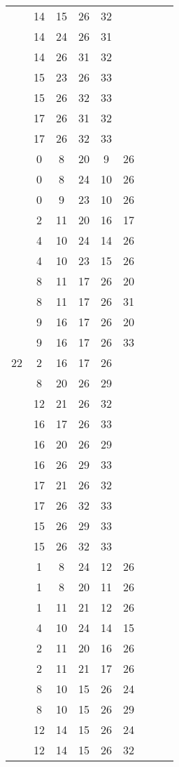 \begin{table}[H]
\begin{tabular}{|c|cccccccc|}
 & 14 & 15 & 26 & 32 &   &   &   &  \\
 & 14 & 24 & 26 & 31 &   &   &   &  \\
 & 14 & 26 & 31 & 32 &   &   &   &  \\
 & 15 & 23 & 26 & 33 &   &   &   &  \\
 & 15 & 26 & 32 & 33 &   &   &   &  \\
 & 17 & 26 & 31 & 32 &   &   &   &  \\
 & 17 & 26 & 32 & 33 &   &   &   &  \\
 & 0 & 8 & 20 & 9 & 26 &   &   &  \\
 & 0 & 8 & 24 & 10 & 26 &   &   &  \\
 & 0 & 9 & 23 & 10 & 26 &   &   &  \\
 & 2 & 11 & 20 & 16 & 17 &   &   &  \\
 & 4 & 10 & 24 & 14 & 26 &   &   &  \\
 & 4 & 10 & 23 & 15 & 26 &   &   &  \\
 & 8 & 11 & 17 & 26 & 20 &   &   &  \\
 & 8 & 11 & 17 & 26 & 31 &   &   &  \\
 & 9 & 16 & 17 & 26 & 20 &   &   &  \\
 & 9 & 16 & 17 & 26 & 33 &   &   &  \\
\hline
22  & 2 & 16 & 17 & 26 &   &   &   &  \\
 & 8 & 20 & 26 & 29 &   &   &   &  \\
 & 12 & 21 & 26 & 32 &   &   &   &  \\
 & 16 & 17 & 26 & 33 &   &   &   &  \\
 & 16 & 20 & 26 & 29 &   &   &   &  \\
 & 16 & 26 & 29 & 33 &   &   &   &  \\
 & 17 & 21 & 26 & 32 &   &   &   &  \\
 & 17 & 26 & 32 & 33 &   &   &   &  \\
 & 15 & 26 & 29 & 33 &   &   &   &  \\
 & 15 & 26 & 32 & 33 &   &   &   &  \\
 & 1 & 8 & 24 & 12 & 26 &   &   &  \\
 & 1 & 8 & 20 & 11 & 26 &   &   &  \\
 & 1 & 11 & 21 & 12 & 26 &   &   &  \\
 & 4 & 10 & 24 & 14 & 15 &   &   &  \\
 & 2 & 11 & 20 & 16 & 26 &   &   &  \\
 & 2 & 11 & 21 & 17 & 26 &   &   &  \\
 & 8 & 10 & 15 & 26 & 24 &   &   &  \\
 & 8 & 10 & 15 & 26 & 29 &   &   &  \\
 & 12 & 14 & 15 & 26 & 24 &   &   &  \\
 & 12 & 14 & 15 & 26 & 32 &   &   &  \\
\end{tabular}
\end{table}
